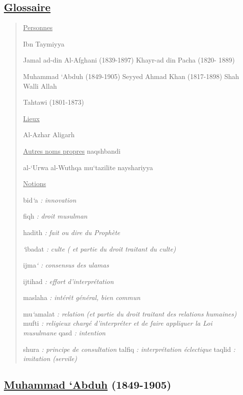 \hypertarget{glossaire-2}{%
\subsection{\texorpdfstring{\underline{Glossaire}}{Glossaire}}\label{glossaire-2}}

\begin{quote}
\underline{Personnes}

Ibn Taymiyya

Jamal ad-din Al-Afghani (1839-1897) Khayr-ad din Pacha (1820- 1889)

Muhammad `Abduh (1849-1905) Seyyed Ahmad Khan (1817-1898) Shah Walli
Allah

Tahtawi (1801-1873)

\underline{Lieux}

Al-Azhar Aligarh

\underline{Autres noms propres} naqshbandi

al-`Urwa al-Wuthqa mu`tazilite nayshariyya

\underline{Notions}

bid\emph{`}a \emph{: innovation}

fiqh \emph{: droit musulman}

hadith \emph{: fait ou dire du Prophète}

\emph{`}ibadat \emph{: culte ( et partie du droit traitant du culte)}

ijma\emph{` : consensus des ulamas}

ijtihad \emph{: effort d'interprétation}

maslaha \emph{: intérêt général, bien commun}

mu\emph{`}amalat \emph{: relation (et partie du droit traitant des
relations humaines)} mufti \emph{: religieux chargé d'interpréter et de
faire appliquer la Loi musulmane} qasd \emph{: intention}

shura \emph{: principe de consultation} talfiq \emph{: interprétation
éclectique} taqlid \emph{: imitation (servile)}
\end{quote}

\hypertarget{muhammad-abduh-1849-1905}{%
\subsection{\texorpdfstring{\underline{Muhammad `Abduh}
(1849-1905)}{Muhammad `Abduh (1849-1905)}}\label{muhammad-abduh-1849-1905}}


